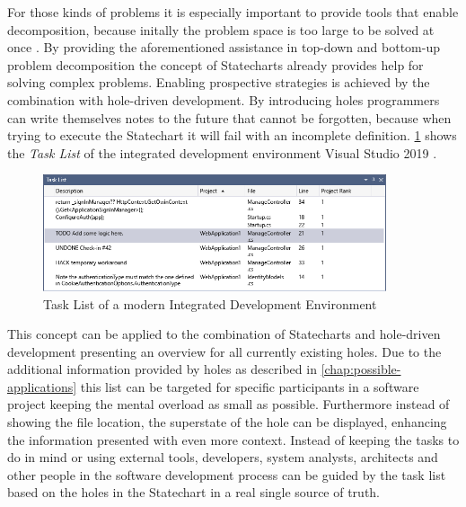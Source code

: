 For those kinds of problems it is especially important to provide tools that enable decomposition, because initally the problem space is too large to be solved at once \autocite{dutke_mentale_1994}.
By providing the aforementioned assistance in top-down and bottom-up problem decomposition the concept of Statecharts already provides help for solving complex problems.
Enabling prospective strategies is achieved by the combination with hole-driven development.
By introducing holes programmers can write themselves notes to the future that cannot be forgotten, because when trying to execute the Statechart it will fail with an incomplete definition.
\cref{fig:vs-task-list} shows the \emph{Task List} of the integrated development environment Visual Studio 2019 \autocite{hogensen_use_2019}.
\begin{figure}[h]
\centering
\includegraphics[width=0.9\textwidth]{images/task-list}
\caption{Task List of a modern Integrated Development Environment}
\label{fig:vs-task-list}
\end{figure}
This concept can be applied to the combination of Statecharts and hole-driven development presenting an overview for all currently existing holes.
Due to the additional information provided by holes as described in \cref{chap:possible-applications} this list can be targeted for specific participants in a software project keeping the mental overload as small as possible.
Furthermore instead of showing the file location, the superstate of the hole can be displayed, enhancing the information presented with even more context.
Instead of keeping the tasks to do in mind or using external tools, developers, system analysts, architects and other people in the software development process can be guided by the task list based on the holes in the Statechart in a real single source of truth.


